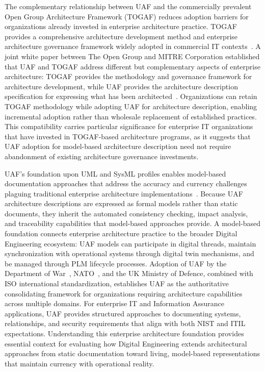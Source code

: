 The complementary relationship between UAF and the commercially prevalent Open Group Architecture Framework (TOGAF) reduces adoption barriers for organizations already invested in enterprise architecture practice. TOGAF provides a comprehensive architecture development method and enterprise architecture governance framework widely adopted in commercial IT contexts~\parencite{TOGAF_2018}. A joint white paper between The Open Group and MITRE Corporation established that UAF and TOGAF address different but complementary aspects of enterprise architecture: TOGAF provides the methodology and governance framework for architecture development, while UAF provides the architecture description specification for expressing what has been architected~\parencite{OpenGroup_MITRE_2013}. Organizations can retain TOGAF methodology while adopting UAF for architecture description, enabling incremental adoption rather than wholesale replacement of established practices. This compatibility carries particular significance for enterprise IT organizations that have invested in TOGAF-based architecture programs, as it suggests that UAF adoption for model-based architecture description need not require abandonment of existing architecture governance investments.

UAF's foundation upon UML and SysML profiles enables model-based documentation approaches that address the accuracy and currency challenges plaguing traditional enterprise architecture implementations~\parencite{Aerospace_UAF_2023}. Because UAF architecture descriptions are expressed as formal models rather than static documents, they inherit the automated consistency checking, impact analysis, and traceability capabilities that model-based approaches provide. A model-based foundation connects enterprise architecture practice to the broader Digital Engineering ecosystem: UAF models can participate in digital threads, maintain synchronization with operational systems through digital twin mechanisms, and be managed through PLM lifecycle processes. Adoption of UAF by the Department of War~\parencite{DoD_Engineering_2022}, NATO~\parencite{NATO_NAF_2018}, and the UK Ministry of Defence, combined with ISO international standardization, establishes UAF as the authoritative consolidating framework for organizations requiring architecture capabilities across multiple domains. For enterprise IT and Information Assurance applications, UAF provides structured approaches to documenting systems, relationships, and security requirements that align with both NIST and ITIL expectations. Understanding this enterprise architecture foundation provides essential context for evaluating how Digital Engineering extends architectural approaches from static documentation toward living, model-based representations that maintain currency with operational reality.

